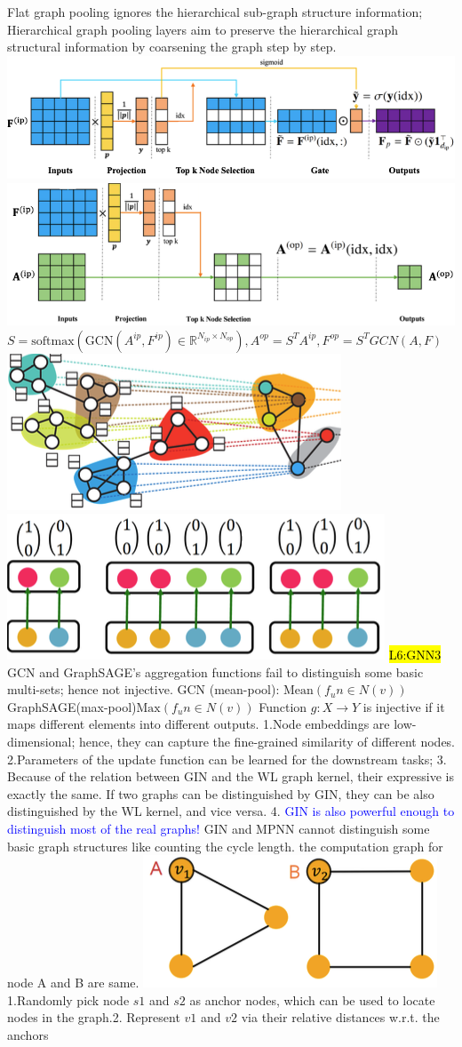\)
  Flat graph pooling ignores the hierarchical sub-graph structure information; Hierarchical graph pooling layers aim to preserve the hierarchical graph structural information by coarsening the graph step by step. 
\includegraphics[height=0.022\textwidth]{figs/l5-4.png} 
\includegraphics[height=0.022\textwidth]{figs/l5-3.png} 
\(S = \text{softmax}(\text{GCN}(A^{ip}, F^{ip}) \in \mathbb{R}^{N_{ip} \times N_{op}}), A^{op}=S^TA^{ip}, F^{op}=S^TGCN(A,F)
\)
\includegraphics[height=0.022\textwidth]{figs/l5-5.png} 
\includegraphics[height=0.022\textwidth]{figs/l6-8.png}
\hl{L6:GNN3} GCN and GraphSAGE’s aggregation functions fail to distinguish some basic multi-sets; hence not injective. GCN (mean-pool): 
$\text{Mean}({f_{u}} n \in N(v)) $
GraphSAGE(max-pool)$\text{Max}({f_{u}} n \in N(v)) $
Function \( g: X \rightarrow Y \) is injective if it maps different elements into different outputs.
 1.Node embeddings are low-dimensional; hence, they can capture the fine-grained similarity of different nodes. 2.Parameters of the update function can be learned for the downstream tasks; 3. Because of the relation between GIN and the WL graph kernel, their expressive is exactly the same. If two graphs can be distinguished by GIN, they can be also distinguished by the WL kernel, and vice versa. 4. \textcolor{blue}{GIN is also powerful enough to distinguish most of the real graphs!}
GIN and MPNN cannot distinguish some basic graph structures like counting the cycle length. the computation graph for node A and B are same.
\includegraphics[height=0.02\textwidth]{figs/l6-1.png} 
 1.Randomly pick node \( s1 \) and \( s2 \) as anchor nodes, which can be used to locate nodes in the graph.2. Represent \( v1 \) and \( v2 \) via their relative distances w.r.t. the anchors
